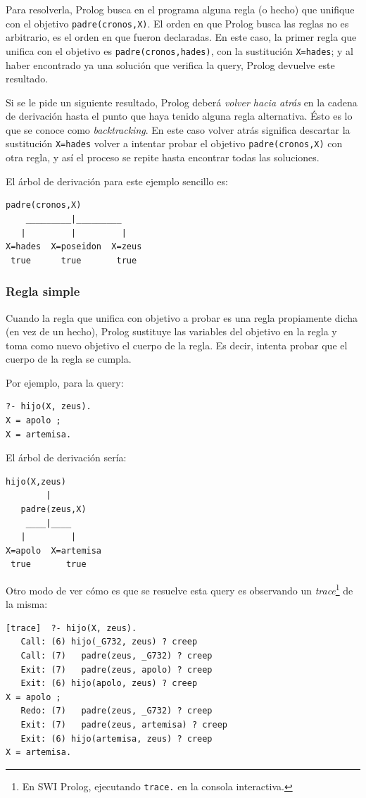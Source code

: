 \documentclass[12pt,titlepage]{article}
\begin{document}
Para resolverla, Prolog busca en el programa alguna regla (o hecho) que unifique con el objetivo \lstinline|padre(cronos,X)|. El orden en que Prolog busca las reglas no es arbitrario, es el orden en que fueron declaradas. En este caso, la primer regla que unifica con el objetivo es \lstinline|padre(cronos,hades)|, con la sustitución \lstinline|X=hades|; y al haber encontrado ya una solución que verifica la query, Prolog devuelve este resultado. 

Si se le pide un siguiente resultado, Prolog deberá \emph{volver hacia atrás} en la cadena de derivación hasta el punto que haya tenido alguna regla alternativa. Ésto es lo que se conoce como \emph{backtracking}. En este caso volver atrás significa descartar la sustitución \lstinline|X=hades| volver a intentar probar el objetivo \lstinline|padre(cronos,X)| con otra regla, y así el proceso se repite hasta encontrar todas las soluciones.

El árbol de derivación para este ejemplo sencillo es:
\begin{Verbatim}[samepage=true]
       padre(cronos,X)
    _________|_________
   |         |         |
X=hades  X=poseidon  X=zeus
 true      true       true
\end{Verbatim}

\subsubsection{Regla simple}

Cuando la regla que unifica con objetivo a probar es una regla propiamente dicha (en vez de un hecho), Prolog sustituye las variables del objetivo en la regla y toma como nuevo objetivo el cuerpo de la regla. Es decir, intenta probar que el cuerpo de la regla se cumpla.

Por ejemplo, para la query:
\begin{lstlisting}
?- hijo(X, zeus).
X = apolo ;
X = artemisa.
\end{lstlisting}

El árbol de derivación sería:
\begin{Verbatim}[samepage=true]
   hijo(X,zeus)
        |
   padre(zeus,X)
    ____|____
   |         |
X=apolo  X=artemisa
 true       true
\end{Verbatim}

Otro modo de ver cómo es que se resuelve esta query es observando un \emph{trace}\footnote{En SWI Prolog, ejecutando \lstinline|trace.| en la consola interactiva.} de la misma:
\begin{Verbatim}[fontsize=\small]
[trace]  ?- hijo(X, zeus).
   Call: (6) hijo(_G732, zeus) ? creep
   Call: (7)   padre(zeus, _G732) ? creep
   Exit: (7)   padre(zeus, apolo) ? creep
   Exit: (6) hijo(apolo, zeus) ? creep
X = apolo ;
   Redo: (7)   padre(zeus, _G732) ? creep
   Exit: (7)   padre(zeus, artemisa) ? creep
   Exit: (6) hijo(artemisa, zeus) ? creep
X = artemisa.
\end{Verbatim}
\end{document}
